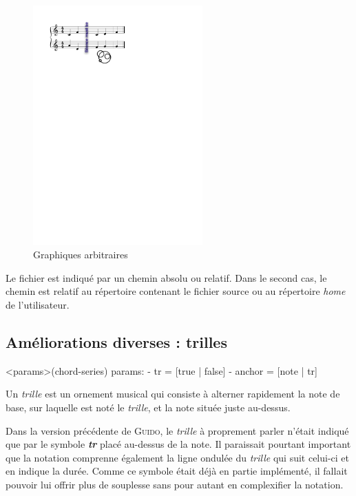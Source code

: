 \documentclass{article}
\newenvironment{gmncode}	{\vspace{-2mm}\small\verbatim}{\endverbatim\vspace{-2mm}}
\newcommand{\guido}			{\textsc{Guido}}
\begin{document}
\begin{figure}[h]
\centering
\includegraphics[width=65mm]{img/partitions/symbol.pdf}
\caption{Graphiques arbitraires}
\label{fig:symbol}
\end{figure}

Le fichier est indiqué par un chemin absolu ou relatif. Dans le second cas, le chemin est relatif au répertoire contenant le fichier source ou au répertoire \emph{home} de l'utilisateur.



\subsection{Améliorations diverses : trilles}\label{subsec:amelioraions}


\begin{gmncode}
  \trill<params>(chord-series)
   params:
    - tr = [true | false]
    - anchor = [note | tr]
\end{gmncode}

Un \emph{trille} est un ornement musical qui consiste à alterner rapidement la note de base, sur laquelle est noté le \emph{trille}, et la note située juste au-dessus.

Dans la version précédente de \guido{}, le \emph{trille} à proprement parler n'était indiqué que par le symbole \textit{\textbf{tr}} placé au-dessus de la note. Il paraissait pourtant important que la notation comprenne également la ligne ondulée du \emph{trille} qui suit celui-ci et en indique la durée. Comme ce symbole était déjà en partie implémenté, il fallait pouvoir lui offrir plus de souplesse sans pour autant en complexifier la notation.
\end{document}
